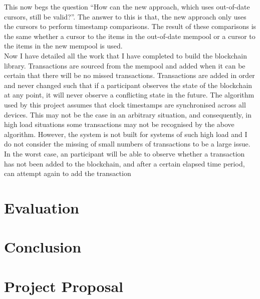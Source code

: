 \documentclass[12pt,a4paper,twoside,openright]{report}
\begin{document}
		This now begs the question ``How can the new approach, which uses out-of-date cursors, still be valid?''.
		The answer to this is that, the new approach only uses the cursors to perform timestamp comparisons.
		The result of these comparisons is the same whether a cursor to the items in the out-of-date mempool or a cursor to the items in the new mempool is used.\\

		Now I have detailed all the work that I have completed to build the blockchain library.
		Transactions are sourced from the mempool and added when it can be certain that there will be no missed transactions.
		Transactions are added in order and never changed such that if a participant observes the state of the blockchain at any point, it will never observe a conflicting state in the future.
		The algorithm used by this project assumes that clock timestamps are synchronised across all devices.
		This may not be the case in an arbitrary situation, and consequently, in high load situations some transactions may not be recognised by the above algorithm. 
		However, the system is not built for systems of such high load and I do not consider the missing of small numbers of transactions to be a large issue. 
		In the worst case, an participant will be able to observe whether a transaction has not been added to the blockchain, and after a certain elapsed time period, can attempt again to add the transaction

	\chapter{Evaluation}
	
	\chapter{Conclusion}
	
	
	
	
	
	\appendix

	\chapter{Project Proposal}
	
	
	
	
\end{document}
